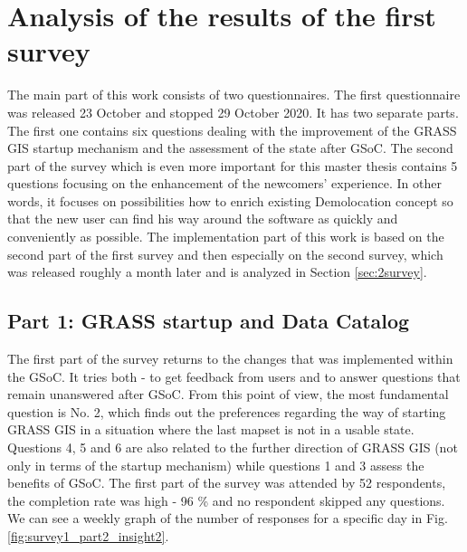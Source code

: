 \documentclass[a4paper,10pt,twoside]{article}
\begin{document}

\newpage
\vspace*{-1cm}
\section{Analysis of the results of the first survey}
\label{sec:qstat}

\noindent The main part of this work consists of two questionnaires. The first questionnaire was released 23 October and stopped 29 October 2020. It has two separate parts. The first one contains six questions dealing with the improvement of the GRASS GIS startup mechanism and the assessment of the state after GSoC. The second part of the survey which is even more important for this master thesis contains 5 questions focusing on the enhancement of the newcomers' experience. In other words, it focuses on possibilities how to enrich existing Demolocation concept so that the new user can find his way around the software as quickly and conveniently as possible. The implementation part of this work is based on the second part of the first survey and then especially on the second survey, which was released roughly a month later and is analyzed in Section \ref{sec:2survey}.

\subsection{Part 1: GRASS startup and Data Catalog}

\noindent The first part of the survey returns to the changes that was implemented within the GSoC. It tries both - to get feedback from users and to answer questions that remain unanswered after GSoC. From this point of view, the most fundamental question is No. 2, which finds out the preferences regarding the way of starting GRASS GIS in a situation where the last mapset is not in a usable state. Questions 4, 5 and 6 are also related to the further direction of GRASS GIS (not only in terms of the startup mechanism) while questions 1 and 3 assess the benefits of GSoC. The first part of the survey was attended by 52 respondents, the completion rate was high - 96 \% and no respondent skipped any questions. We can see a weekly graph of the number of responses for a specific day in Fig. \ref{fig:survey1_part2_insight2}.
\end{document}

